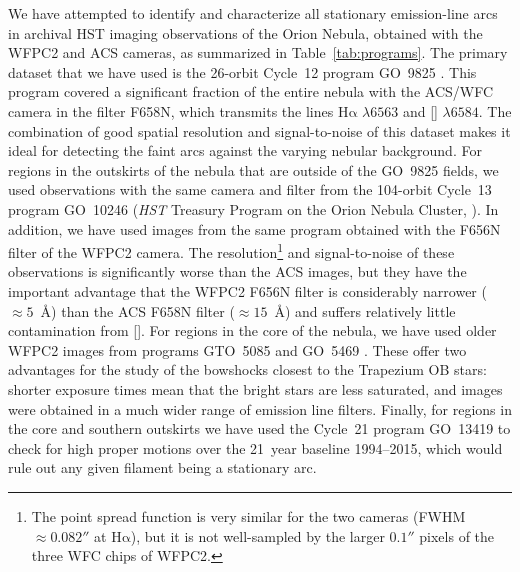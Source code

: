 \documentclass[apj, twocolumn]{aastex63}
\newcommand\nii{[\ion{N}{2}]}
\newcommand\ha{\ensuremath{\mathrm{H\alpha}}}
\newcommand\Wav[1]{\ensuremath{\lambda #1}}
\begin{document}
We have attempted to identify and characterize all stationary
emission-line arcs in archival HST imaging observations of
the Orion Nebula, obtained with the WFPC2 and ACS cameras, as
summarized in Table~\ref{tab:programs}.  The primary dataset that
we have used is the 26-orbit Cycle~12 program GO~9825 \citep{Bally:2006a}.
This program covered a significant fraction of the entire nebula with
the ACS/WFC camera in the filter F658N, which transmits the lines
\ha{} \Wav{6563} and \nii{} \Wav{6584}.  The combination of good
spatial resolution and signal-to-noise of this dataset makes it ideal
for detecting the faint arcs against the varying nebular background.
For regions in the outskirts of the nebula that are outside of the
GO~9825 fields, we used observations with the same camera and filter
from the 104-orbit Cycle~13 program GO~10246 (\textit{HST} Treasury
Program on the Orion Nebula Cluster, \citealp{Robberto:2013a}).
In addition, we have used images from the same program obtained with
the F656N filter of the WFPC2 camera.  The resolution\footnote{The
point spread function is very similar for the two cameras
(FWHM \(\approx 0.082''\) at \ha{}), but it is not well-sampled by
the larger \(0.1''\) pixels of the three WFC chips of WFPC2.} and
signal-to-noise of these observations is significantly worse than
the ACS images, but they have the important advantage that the WFPC2
F656N filter is considerably narrower (\(\approx 5\)~\AA) than
the ACS F658N filter (\(\approx 15\)~\AA) and suffers relatively
little contamination from \nii{}.  For regions in the
core of the nebula, we have used older WFPC2 images from programs
GTO~5085 \citep{ODell:1996a} and GO~5469 \citep{Bally:1998a}.
These offer two advantages for the study of the bowshocks closest
to the Trapezium OB stars: shorter exposure times mean that the
bright stars are less saturated, and images were obtained in a much
wider range of emission line filters.
Finally, for regions in the core and southern outskirts we have used the
Cycle~21 program GO~13419 \citep{Bally:2018c} to check for high proper motions
over the 21~year baseline 1994--2015,
which would rule out any given filament being a stationary arc.
\end{document}
